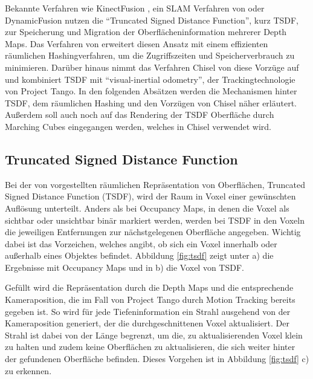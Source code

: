 Bekannte Verfahren wie KinectFusion \citep{newcombe2011kinectfusion}, ein SLAM Verfahren von \citet{bylow2013real} oder DynamicFusion \citep{newcombe2015dynamicfusion} nutzen die \enquote{Truncated Signed Distance Function}, kurz TSDF, zur Speicherung und Migration der Oberflächeninformation mehrerer Depth Maps. Das Verfahren von \citet{niessner2013real} erweitert diesen Ansatz mit einem effizienten räumlichen Hashingverfahren, um die Zugriffszeiten und Speicherverbrauch zu minimieren. Darüber hinaus nimmt das Verfahren Chisel von \citep{Klingensmith_2015_7924} diese Vorzüge auf und kombiniert TSDF mit \enquote{visual-inertial odometry}, der Trackingtechnologie von Project Tango. In den folgenden Absätzen werden die Mechanismen hinter TSDF, dem räumlichen Hashing und den Vorzügen von Chisel näher erläutert. Außerdem soll auch noch auf das Rendering der TSDF Oberfläche durch Marching Cubes eingegangen werden, welches in Chisel verwendet wird. 


\subsection{Truncated Signed Distance Function}

Bei der von \citet{curless1996volumetric} vorgestellten räumlichen Repräsentation von Oberflächen, Truncated Signed Distance Function (TSDF), wird der Raum in Voxel einer gewünschten Auflösung unterteilt. Anders als bei Occupancy Maps, in denen die Voxel als sichtbar oder unsichtbar binär markiert werden, werden bei TSDF in den Voxeln die jeweiligen Entfernungen zur nächstgelegenen Oberfläche angegeben. Wichtig dabei ist das Vorzeichen, welches angibt, ob sich ein Voxel innerhalb oder außerhalb eines Objektes befindet. Abbildung \ref{fig:tsdf} zeigt unter a) die Ergebnisse mit Occupancy Maps und in b) die Voxel von TSDF. \citep{curless1996volumetric} 

Gefüllt wird die Repräsentation durch die Depth Maps und die entsprechende Kameraposition, die im Fall von Project Tango durch Motion Tracking bereits gegeben ist. So wird für jede Tiefeninformation ein Strahl ausgehend von der Kameraposition generiert, der die durchgeschnittenen Voxel aktualisiert. Der Strahl ist dabei von der Länge begrenzt, um die, zu aktualisierenden Voxel klein zu halten und zudem keine Oberflächen zu aktualisieren, die sich weiter hinter der gefundenen Oberfläche befinden. Dieses Vorgehen ist in Abbildung \ref{fig:tsdf} c) zu erkennen. \citep{Compu66:online} 

